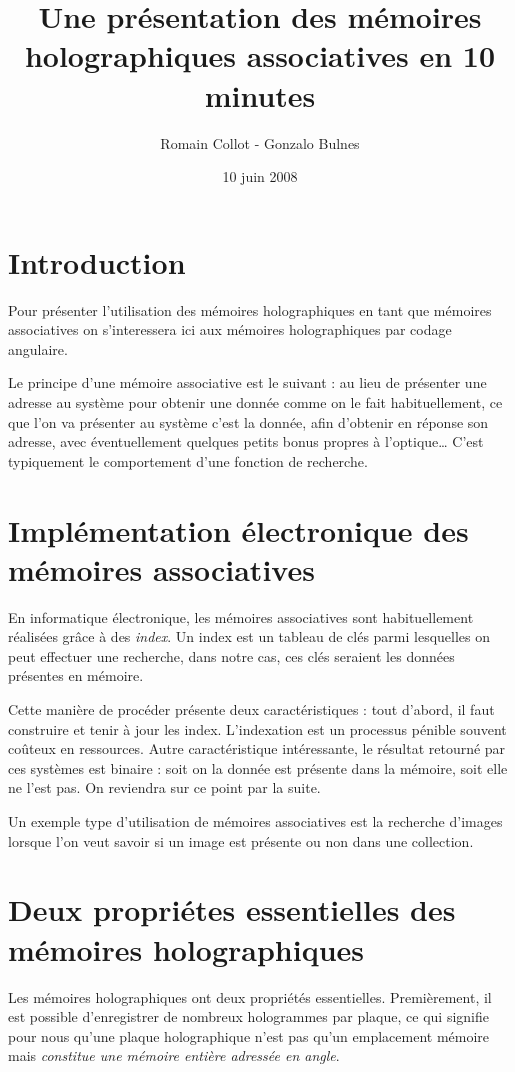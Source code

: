 \documentclass[10pt,a4paper]{article}
\title{Une présentation des mémoires holographiques associatives en 10 minutes}
\author{Romain Collot - Gonzalo Bulnes}
\date{10 juin 2008}
\begin{document}
	\maketitle
	\section[Introduction]{Introduction}
	Pour présenter l'utilisation des mémoires holographiques en tant que mémoires associatives on s'interessera ici aux mémoires holographiques par codage angulaire.
	
	Le principe d'une mémoire associative est le suivant : au lieu de présenter une adresse au système pour obtenir une donnée comme on le fait habituellement, ce que l'on va présenter au système c'est la donnée, afin d'obtenir en réponse son adresse, avec éventuellement quelques petits bonus propres à l'optique\ldots
	C'est typiquement le comportement d'une fonction de recherche.
	
	\section[Implémentation électronique des mémoires associatives]{Implémentation électronique des mémoires associatives}
	En informatique électronique, les mémoires associatives sont habituellement réalisées grâce à des \emph{index}. Un index est un tableau de clés parmi lesquelles on peut effectuer une recherche, dans notre cas, ces clés seraient les données présentes en mémoire.
	
	Cette manière de procéder présente deux caractéristiques : tout d'abord, il faut construire et tenir à jour les index. L'indexation est un processus pénible souvent coûteux en ressources. Autre caractéristique intéressante, le résultat retourné par ces systèmes est binaire : soit on la donnée est présente dans la mémoire, soit elle ne l'est pas. On reviendra sur ce point par la suite.
	
	Un exemple type d'utilisation de mémoires associatives est la recherche d'images lorsque l'on veut savoir si un image est présente ou non dans une collection.
	\section[Deux propriétes essentielles des mémoires holographiques]{Deux propriétes essentielles des mémoires holographiques}
	Les mémoires holographiques ont deux propriétés essentielles. Premièrement, il est possible d'enregistrer de nombreux hologrammes par plaque, ce qui signifie pour nous qu'une plaque holographique n'est pas qu'un emplacement mémoire mais \emph{constitue une mémoire entière adressée en angle}.
	
\end{document}

